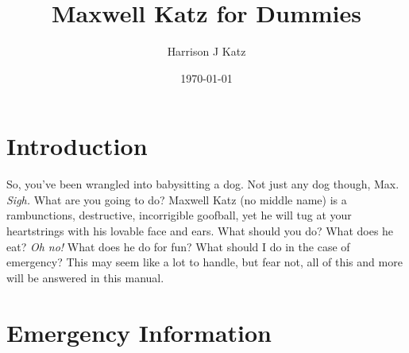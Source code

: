 \documentclass[pdftex,12pt]{article}
\title{Maxwell Katz for Dummies}
\author{Harrison J Katz}
\date{\today}
\begin{document}



\newpage
\tableofcontents
{}

\newpage
\listoffigures

\newpage
{}

\section{Introduction}

So, you've been wrangled into babysitting a dog. Not just any dog though, Max.
\emph{Sigh.} What are you going to do? Maxwell Katz (no middle name) is a
rambunctions, destructive, incorrigible goofball, yet he will tug at your
heartstrings with his lovable face and ears. What should you do? What does he
eat? \emph{Oh no!} What does he do for fun? What should I do in the case of
emergency? This may seem like a lot to handle, but fear not, all of this and
more will be answered in this manual.

\newpage
\section{Emergency Information}
\end{document}
